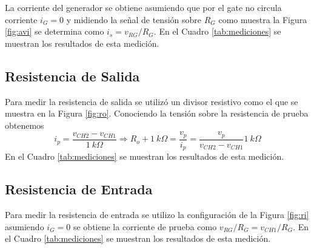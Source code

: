 \documentclass[a4paper, 10pt, spanish]{article}
\begin{document}
La corriente del generador se obtiene asumiendo que por el gate no circula corriente $i_G = 0$ y midiendo la señal de tensión sobre $R_G$ como muestra la Figura \ref{fig:avi} se determina como $i_s = v_{RG}/R_G$. En el Cuadro \ref{tab:mediciones} se muestran los resultados de esta medición.

\subsection{Resistencia de Salida}

Para medir la resistencia de salida se utilizó un divisor resistivo como el que se muestra en la Figura \ref{fig:ro}. Conociendo la tensión sobre la resistencia de prueba obtenemos
\begin{equation}
	i_p = \frac{v_{CH2}-v_{CH1}}{1\ k\Omega} \Rightarrow R_o + 1\ k\Omega = \frac{v_p}{i_p} = \frac{v_p}{v_{CH2}-v_{CH1}}1\ k\Omega
	\end{equation}
En el Cuadro \ref{tab:mediciones} se muestran los resultados de esta medición.

\subsection{Resistencia de Entrada}

Para medir la resistencia de entrada se utilizo la configuración de la Figura \ref{fig:ri} asumiendo $i_G = 0$ se obtiene la corriente de prueba como $v_{RG}/R_G = v_{CH1}/R_G$.
En el Cuadro \ref{tab:mediciones} se muestran los resultados de esta medición.
\end{document}
